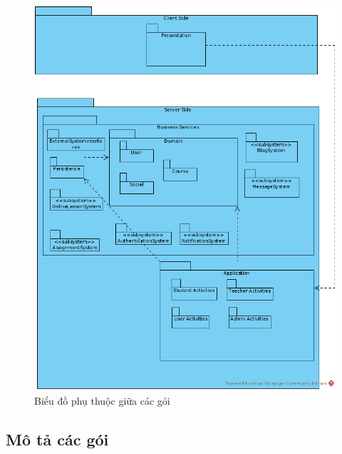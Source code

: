 \documentclass[./../main_file.tex]{subfiles}
\begin{document}
\begin{figure}[H]
	\centering
	\includegraphics[width=\linewidth]{./images/packages_and_dependencies.png}
	\caption{Biểu đồ phụ thuộc giữa các gói}
\end{figure}

\subsection{Mô tả các gói}
\end{document}
